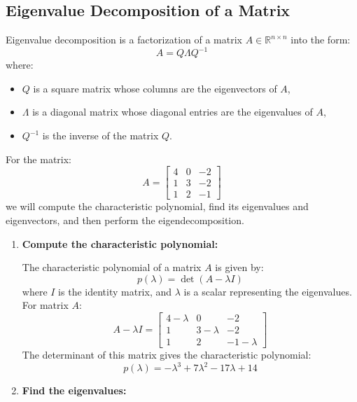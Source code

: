 \subsection{Eigenvalue Decomposition of a Matrix}
\begin{process}

    Eigenvalue decomposition is a factorization of a matrix \( A \in \mathbb{R}^{n \times n} \) into the form:
    \[
    A = Q \Lambda Q^{-1}
    \]
    where:
    \begin{itemize}
        \item \( Q \) is a square matrix whose columns are the eigenvectors of \( A \),
        \item \( \Lambda \) is a diagonal matrix whose diagonal entries are the eigenvalues of \( A \),
        \item \( Q^{-1} \) is the inverse of the matrix \( Q \).
    \end{itemize}
    
    For the matrix:
    \[
    A = \begin{bmatrix}
    4 & 0 & -2 \\
    1 & 3 & -2 \\
    1 & 2 & -1
    \end{bmatrix}
    \]
    we will compute the characteristic polynomial, find its eigenvalues and eigenvectors, and then perform the eigendecomposition.
    
    \begin{enumerate}
        \item \textbf{Compute the characteristic polynomial:}
        
        The characteristic polynomial of a matrix \( A \) is given by:
        \[
        p(\lambda) = \det(A - \lambda I)
        \]
        where \( I \) is the identity matrix, and \( \lambda \) is a scalar representing the eigenvalues. For matrix \( A \):
        \[
        A - \lambda I = \begin{bmatrix}
        4 - \lambda & 0 & -2 \\
        1 & 3 - \lambda & -2 \\
        1 & 2 & -1 - \lambda
        \end{bmatrix}
        \]
        The determinant of this matrix gives the characteristic polynomial:
        \[
        p(\lambda) = -\lambda^3 + 7\lambda^2 - 17\lambda + 14
        \]
    
        \item \textbf{Find the eigenvalues:}
        

\end{enumerate}
\end{process}
